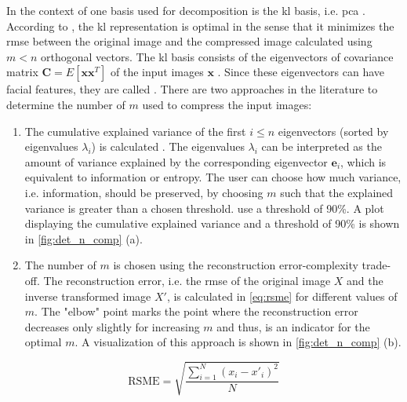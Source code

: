 In the context of \eigenfaces{} one basis used for decomposition is the \ac{kl} basis, i.e. \ac{pca} \cite{eigenfaces1997, eigenfaces1991}.
According to \citeauthor{eigenfaces1997}, the \ac{kl} representation is optimal in the sense that it minimizes the \ac{rmse} between the original image and 
the compressed image calculated using $m < n$ orthogonal vectors.
The \ac{kl} basis consists of the eigenvectors of covariance matrix $\textbf{C} = E\left[ \textbf{x}\textbf{x}^{T} \right]$ of the input images $\mathbf{x}$ \cite{eigenfaces1997}.
Since these eigenvectors can have facial features, they are called \textit{\eigenfaces{}}.
There are two approaches in the literature to determine the number of \eigenfaces{} $m$ used to compress the input images:
\begin{enumerate}[label=(\alph*)]
    \item The cumulative explained variance of the first $i \le n$ eigenvectors (sorted by eigenvalues $\lambda_i$) is calculated 
        \cite{eigenfaces1997, face-recognition2020, face-recognition2021}.
        The eigenvalues $\lambda_i$ can be interpreted as the amount of variance explained by the corresponding eigenvector $\textbf{e}_i$, which is equivalent to information or entropy.
        The user can choose how much variance, i.e. information, should be preserved, by choosing $m$ such that the explained variance is greater than a chosen threshold.
        \citeauthor{face-recognition2021} use a threshold of 90\%.
        A plot displaying the cumulative explained variance and a threshold of 90\% is shown in \autoref{fig:det_n_comp} (a).

    \item The number of \eigenfaces{} $m$ is chosen using the reconstruction error-complexity trade-off. %
        The reconstruction error, i.e. the \ac{rmse} of the original image $X$ and the inverse transformed image $X'$, is 
        calculated in \autoref{eq:rsme} for different values of $m$.
        The "elbow" point marks the point where the reconstruction error decreases only slightly for increasing $m$ and thus, is an indicator for the optimal $m$.
        A visualization of this approach is shown in \autoref{fig:det_n_comp} (b).
\end{enumerate}

\begin{equation}
    \text{RSME} = \sqrt{\frac{\sum_{i=1}^{N}(x_{i}-x'_i)^2}{N}}
    \label{eq:rsme}
\end{equation}
 
